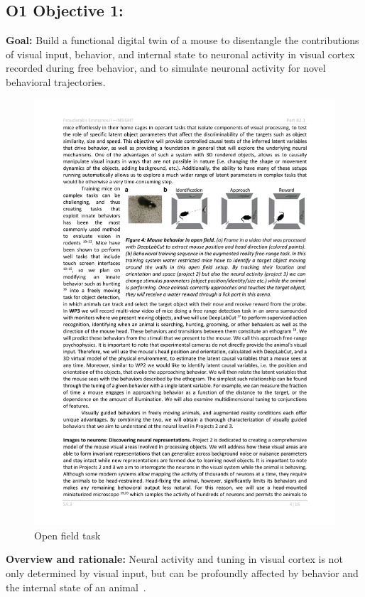 \documentclass[B2,COG]{ercgrant}
\begin{document}
\subsection{\colorbox{obj1}{\color{white}O1} Objective 1: \oonetitle}

\textbf{Goal:} Build a functional digital twin of a mouse to disentangle the contributions of visual input, behavior, and internal state to neuronal activity in visual cortex recorded during free behavior, and to simulate neuronal activity for novel behavioral trajectories.

\begin{figure}
\includegraphics[width=\linewidth,trim=0 15 0 5, clip]{figures/openfield_ar.pdf}
\caption{Open field task}
\label{fig:openfield}
\end{figure}
\textbf{Overview and rationale:} Neural activity and tuning in visual cortex is not only determined by visual input, but can be profoundly affected by behavior and the internal state of an animal~\parencite{Niell2010-bs,Musall2019-kd,Stringer2019-lt, Franke2022-do}.
\end{document}
